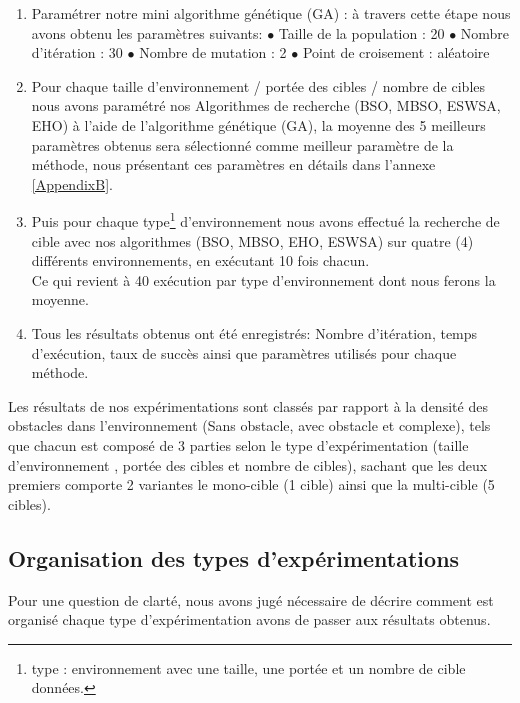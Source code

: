 \begin{enumerate}
	\item Paramétrer notre mini algorithme génétique (GA) : à travers cette étape nous avons obtenu les paramètres suivants:
		\subitem $\bullet$ Taille de la population : 20
		\subitem $\bullet$ Nombre d'itération : 30
		\subitem $\bullet$ Nombre de mutation : 2
		\subitem $\bullet$ Point de croisement : aléatoire
	
	\item Pour chaque taille d'environnement / portée des cibles / nombre de cibles nous avons paramétré nos Algorithmes de recherche (BSO, MBSO, ESWSA, EHO) à l'aide de l'algorithme génétique (GA), la moyenne des 5 meilleurs paramètres obtenus sera sélectionné comme meilleur paramètre de la méthode, nous présentant ces paramètres en détails dans l'annexe \ref{AppendixB}.
	
	\item Puis pour chaque type\footnote{type : environnement avec une taille, une portée et un nombre de cible données.} d'environnement nous avons effectué la recherche de cible avec nos algorithmes (BSO, MBSO, EHO, ESWSA) sur quatre (4) différents environnements, en exécutant 10 fois chacun.\\
	Ce qui revient à 40 exécution par type  d'environnement dont nous ferons la moyenne.
	
	\item Tous les résultats obtenus ont été enregistrés: Nombre d'itération, temps d'exécution, taux de succès %
	 ainsi que paramètres utilisés pour chaque méthode.
\end{enumerate}

Les résultats de nos expérimentations sont classés par rapport à la densité des obstacles dans l'environnement (Sans obstacle, avec obstacle et complexe), tels que chacun est composé de 3 parties selon le type d'expérimentation (taille d'environnement , portée des cibles et nombre de cibles), sachant que les deux premiers comporte 2 variantes le mono-cible (1 cible) ainsi que la multi-cible (5 cibles).

\subsection{Organisation des types d'expérimentations}
Pour une question de clarté, nous avons jugé nécessaire de décrire comment est organisé chaque type d'expérimentation avons de passer aux résultats obtenus.

